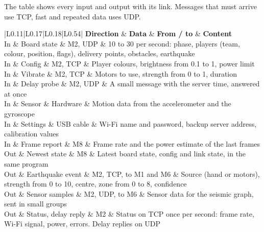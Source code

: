 \documentclass[
  english,
  10pt,
  a4paper,
]{article}
\newcommand{\ckkeep}[1]{\par\noindent\begin{minipage}{\linewidth}\setlength{\parskip}{4pt}#1\end{minipage}\par\smallskip}
\begin{document}

\ckkeep{%
The table shows every input and output with its link. Messages that must arrive use TCP, fast and
repeated data uses UDP.

\begin{tabular}{|L{0.11}|L{0.17}|L{0.18}|L{0.54}|}
\hline \textbf{Direction} & \textbf{Data} & \textbf{From / to} & \textbf{Content} \\ \hline 
In & Board state & M2, UDP & 10 to 30 per second: phase, players (team, colour, position, flags), delivery points, obstacles, earthquake \\ \hline
In & Config & M2, TCP & Player colours, brightness from 0.1 to 1, power limit \\ \hline
In & Vibrate & M2, TCP & Motors to use, strength from 0 to 1, duration \\ \hline
In & Delay probe & M2, UDP & A small message with the server time, answered at once \\ \hline
In & Sensor & Hardware & Motion data from the accelerometer and the gyroscope \\ \hline
In & Settings & USB cable & Wi-Fi name and password, backup server address, calibration values \\ \hline
In & Frame report & M8 & Frame rate and the power estimate of the last frames \\ \hline
Out & Newest state & M8 & Latest board state, config and link state, in the same program \\ \hline
Out & Earthquake event & M2, TCP, to M1 and M6 & Source (hand or motors), strength from 0 to 10, centre, zone from 0 to 8, confidence \\ \hline
Out & Sensor samples & M2, UDP, to M6 & Sensor data for the seismic graph, sent in small groups \\ \hline
Out & Status, delay reply & M2 & Status on TCP once per second: frame rate, Wi-Fi signal, power, errors. Delay replies on UDP \\ \hline
\end{tabular}}

\end{document}
